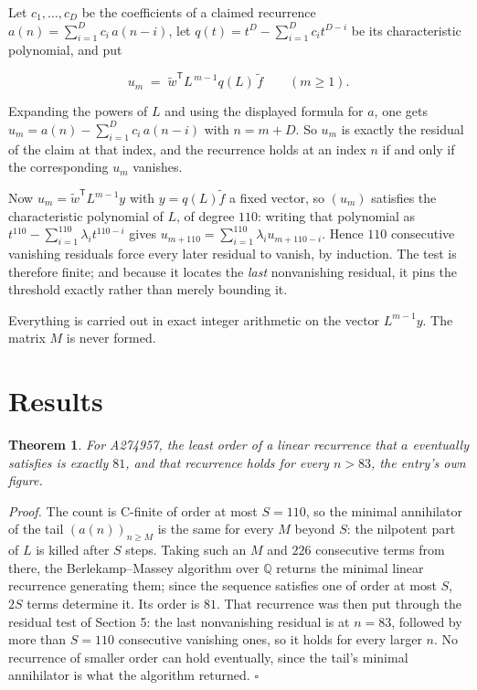 \documentclass[11pt]{article}
\newtheorem{theorem}{Theorem}
\theoremstyle{definition}
\begin{document}
Let $c_1,\dots,c_D$ be the coefficients of a claimed recurrence $a(n) = \sum_{i=1}^{D} c_i\,a(n-i)$, let $q(t) = t^{D} - \sum_{i=1}^{D} c_i t^{D-i}$ be its characteristic polynomial, and put

\[u_m \;=\; \tilde w^{\mathsf T} L^{\,m-1} q(L)\,\tilde f \qquad (m \ge 1).\]

Expanding the powers of $L$ and using the displayed formula for $a$, one gets $u_m = a(n) - \sum_{i=1}^{D} c_i\,a(n-i)$ with $n = m + D$. So $u_m$ is exactly the residual of the claim at that index, and the recurrence holds at an index $n$ if and only if the corresponding $u_m$ vanishes.

Now $u_m = \tilde w^{\mathsf T} L^{m-1} y$ with $y = q(L)\tilde f$ a fixed vector, so $(u_m)$ satisfies the characteristic polynomial of $L$, of degree $110$: writing that polynomial as $t^{110} - \sum_{i=1}^{110} \lambda_i t^{110-i}$ gives $u_{m+110} = \sum_{i=1}^{110} \lambda_i u_{m+110-i}$. Hence $110$ consecutive vanishing residuals force every later residual to vanish, by induction. The test is therefore finite; and because it locates the {\itshape last} nonvanishing residual, it pins the threshold exactly rather than merely bounding it.

Everything is carried out in exact integer arithmetic on the vector $L^{m-1}y$. The matrix $M$ is never formed.

\section{Results}

\begin{theorem} For A274957, the least order of a linear recurrence that $a$ eventually satisfies is exactly $81$, and that recurrence holds for every $n > 83$, the entry's own figure.\end{theorem}

{\itshape Proof.} The count is C-finite of order at most $S = 110$, so the minimal annihilator of the tail $(a(n))_{n \ge M}$ is the same for every $M$ beyond $S$: the nilpotent part of $L$ is killed after $S$ steps. Taking such an $M$ and $226$ consecutive terms from there, the Berlekamp--Massey algorithm over $\mathbb{Q}$ returns the minimal linear recurrence generating them; since the sequence satisfies one of order at most $S$, $2S$ terms determine it. Its order is $81$. That recurrence was then put through the residual test of Section 5: the last nonvanishing residual is at $n = 83$, followed by more than $S = 110$ consecutive vanishing ones, so it holds for every larger $n$. No recurrence of smaller order can hold eventually, since the tail's minimal annihilator is what the algorithm returned. $\square$
\end{document}
